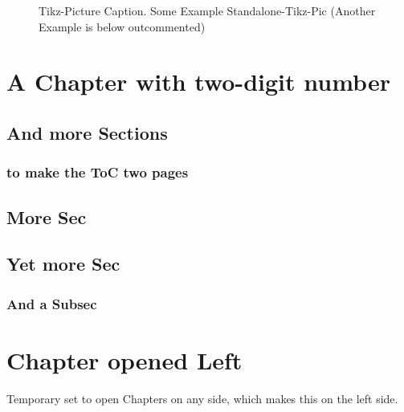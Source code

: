 \np
%
\begin{figure}[!htpb]
    \centering
    \caption{Tikz-Picture Caption. Some Example Standalone-Tikz-Pic (Another Example is below outcommented)}
    \label{fig:tikz_test}
\end{figure}
%
%
%
%



\setcounter{chapter}{9}
\chapter{A Chapter with two-digit number}
\section{And more Sections}
\subsection{to make the ToC two pages}
\section{More Sec}
\section{Yet more Sec}
\subsection{And a Subsec}





\headingOpenTempAny%
\chapter{Chapter opened Left}
\headingOpenTempRestore%

Temporary set to open Chapters on any side, which makes this on the left side.